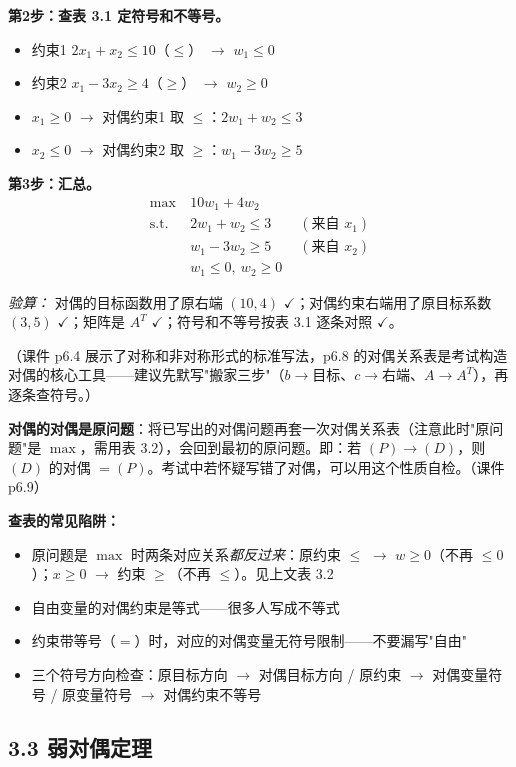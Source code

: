 \textbf{第2步：查表 3.1 定符号和不等号。}
\begin{itemize}
  \item 约束1 $2x_1+x_2\le10$（$\le$） $\to$ $w_1 \le 0$
  \item 约束2 $x_1-3x_2\ge4$（$\ge$） $\to$ $w_2 \ge 0$
  \item $x_1\ge0$ $\to$ 对偶约束1 取 $\le$：$2w_1 + w_2 \le 3$
  \item $x_2\le0$ $\to$ 对偶约束2 取 $\ge$：$w_1 - 3w_2 \ge 5$
\end{itemize}

\textbf{第3步：汇总。}
\[
\begin{aligned}
\max\ & 10w_1 + 4w_2 \\
\text{s.t.}\ & 2w_1 + w_2 \le 3 \qquad (\text{来自 }x_1)\\
& w_1 - 3w_2 \ge 5 \qquad (\text{来自 }x_2)\\
& w_1 \le 0,\ w_2 \ge 0
\end{aligned}
\]

\emph{验算：} 对偶的目标函数用了原右端 $(10,4)$ $\checkmark$；对偶约束右端用了原目标系数 $(3,5)$ $\checkmark$；矩阵是 $A^T$ $\checkmark$；符号和不等号按表 3.1 逐条对照 $\checkmark$。

\medskip
（课件 p6.4 展示了对称和非对称形式的标准写法，p6.8 的对偶关系表是考试构造对偶的核心工具——建议先默写"搬家三步"（$b\to$目标、$c\to$右端、$A\to A^T$），再逐条查符号。）

\textbf{对偶的对偶是原问题}：将已写出的对偶问题再套一次对偶关系表（注意此时"原问题"是 $\max$，需用表 3.2），会回到最初的原问题。即：若 $(P) \to (D)$，则 $(D)$ 的对偶 $=(P)$。考试中若怀疑写错了对偶，可以用这个性质自检。（课件 p6.9）

\medskip
\textbf{查表的常见陷阱：}
\begin{itemize}
  \item 原问题是 $\max$ 时两条对应关系\emph{都反过来}：原约束 $\le$ $\to$ $w\ge0$（不再 $\le0$）；$x\ge0$ $\to$ 约束 $\ge$（不再 $\le$）。见上文表 3.2
  \item 自由变量的对偶约束是等式——很多人写成不等式
  \item 约束带等号（$=$）时，对应的对偶变量无符号限制——不要漏写"自由"
  \item 三个符号方向检查：原目标方向 $\to$ 对偶目标方向 / 原约束 $\to$ 对偶变量符号 / 原变量符号 $\to$ 对偶约束不等号
\end{itemize}

\subsection{3.3 弱对偶定理}

